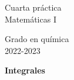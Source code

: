 \documentclass{article}
\title{\tit}
\author{}
\date{}
\def\tit{Integrales}
\begin{document}
\noindent\begin{minipage}{.4\textwidth}
\large
Cuarta práctica\\
Matemáticas I
\end{minipage}
\hfill
\begin{minipage}{.4\textwidth}
\large
\flushright
Grado en química\\
2022-2023
\end{minipage}

\bigskip

\begin{center}
\textbf{
\huge
\tit
}
\end{center}


\end{document}
